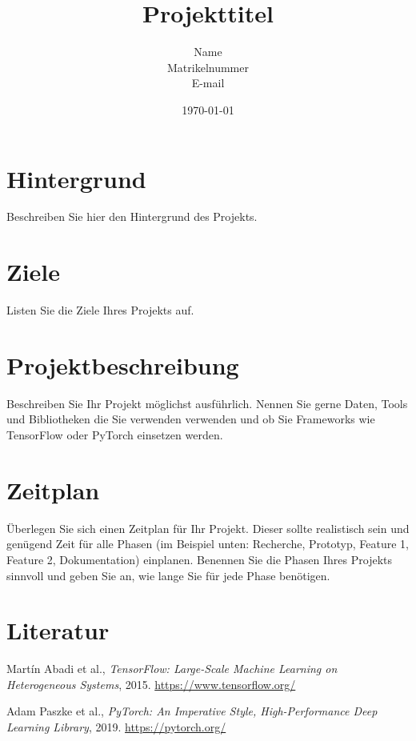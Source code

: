 \documentclass[a4paper, 11pt, toc=listof, toc=bib]{scrartcl}
\title{{{Projekttitel}}}
\author{{{Name}} \\ {{Matrikelnummer}} \\ {{E-mail}}}
\date{\today}
\begin{document}
\maketitle

\section{Hintergrund}
Beschreiben Sie hier den Hintergrund des Projekts.

\section{Ziele}
Listen Sie die Ziele Ihres Projekts auf.

\section{Projektbeschreibung}
Beschreiben Sie Ihr Projekt möglichst ausführlich. Nennen Sie gerne Daten, Tools und Bibliotheken die Sie verwenden verwenden und ob Sie Frameworks wie TensorFlow \cite{tensorflow2015} oder PyTorch \cite{pytorch2019} einsetzen werden.

\section{Zeitplan}
Überlegen Sie sich einen Zeitplan für Ihr Projekt. Dieser sollte realistisch sein und genügend Zeit für alle Phasen (im Beispiel unten: Recherche, Prototyp, Feature 1, Feature 2, Dokumentation) einplanen.
Benennen Sie die Phasen Ihres Projekts sinnvoll und geben Sie an, wie lange Sie für jede Phase benötigen.

\noindent %

\section{Literatur}
\begin{thebibliography}{99}

Martín Abadi et al., \emph{TensorFlow: Large-Scale Machine Learning on Heterogeneous Systems}, 2015.  
\url{https://www.tensorflow.org/}

Adam Paszke et al., \emph{PyTorch: An Imperative Style, High-Performance Deep Learning Library}, 2019.  
\url{https://pytorch.org/}

\end{thebibliography}
\end{document}
